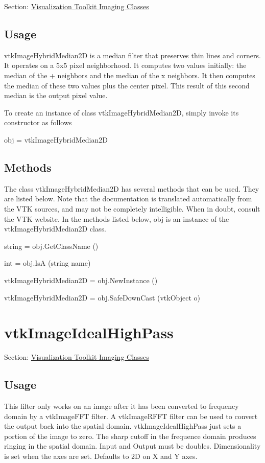 Section\-: \hyperlink{sec_vtkimaging}{Visualization Toolkit Imaging Classes} \hypertarget{vtkwidgets_vtkxyplotwidget_Usage}{}\subsection{Usage}\label{vtkwidgets_vtkxyplotwidget_Usage}
vtk\-Image\-Hybrid\-Median2\-D is a median filter that preserves thin lines and corners. It operates on a 5x5 pixel neighborhood. It computes two values initially\-: the median of the + neighbors and the median of the x neighbors. It then computes the median of these two values plus the center pixel. This result of this second median is the output pixel value.

To create an instance of class vtk\-Image\-Hybrid\-Median2\-D, simply invoke its constructor as follows \begin{DoxyVerb}  obj = vtkImageHybridMedian2D
\end{DoxyVerb}
 \hypertarget{vtkwidgets_vtkxyplotwidget_Methods}{}\subsection{Methods}\label{vtkwidgets_vtkxyplotwidget_Methods}
The class vtk\-Image\-Hybrid\-Median2\-D has several methods that can be used. They are listed below. Note that the documentation is translated automatically from the V\-T\-K sources, and may not be completely intelligible. When in doubt, consult the V\-T\-K website. In the methods listed below, {\ttfamily obj} is an instance of the vtk\-Image\-Hybrid\-Median2\-D class. 
\begin{DoxyItemize}
\item {\ttfamily string = obj.\-Get\-Class\-Name ()}  
\item {\ttfamily int = obj.\-Is\-A (string name)}  
\item {\ttfamily vtk\-Image\-Hybrid\-Median2\-D = obj.\-New\-Instance ()}  
\item {\ttfamily vtk\-Image\-Hybrid\-Median2\-D = obj.\-Safe\-Down\-Cast (vtk\-Object o)}  
\end{DoxyItemize}\hypertarget{vtkimaging_vtkimageidealhighpass}{}\section{vtk\-Image\-Ideal\-High\-Pass}\label{vtkimaging_vtkimageidealhighpass}
Section\-: \hyperlink{sec_vtkimaging}{Visualization Toolkit Imaging Classes} \hypertarget{vtkwidgets_vtkxyplotwidget_Usage}{}\subsection{Usage}\label{vtkwidgets_vtkxyplotwidget_Usage}
This filter only works on an image after it has been converted to frequency domain by a vtk\-Image\-F\-F\-T filter. A vtk\-Image\-R\-F\-F\-T filter can be used to convert the output back into the spatial domain. vtk\-Image\-Ideal\-High\-Pass just sets a portion of the image to zero. The sharp cutoff in the frequence domain produces ringing in the spatial domain. Input and Output must be doubles. Dimensionality is set when the axes are set. Defaults to 2\-D on X and Y axes.

